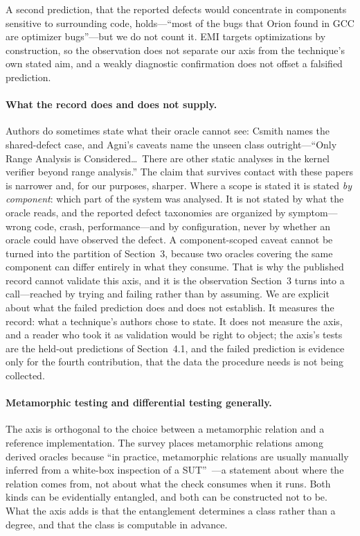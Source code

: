 A second prediction, that the reported defects would concentrate in components
sensitive to surrounding code, holds---``most of the bugs that Orion found in GCC are
optimizer bugs''---but we do not count it. EMI targets optimizations by construction,
so the observation does not separate our axis from the technique's own stated aim, and
a weakly diagnostic confirmation does not offset a falsified prediction.

\paragraph{What the record does and does not supply.}
Authors do sometimes state what their oracle cannot see: Csmith names the shared-defect
case, and Agni's caveats name the unseen class outright---``Only Range Analysis is
Considered\ldots\ There are other static analyses in the kernel verifier beyond range
analysis.'' The claim that survives contact with these papers is narrower and, for our
purposes, sharper. Where a scope is stated it is stated \emph{by component}: which part
of the system was analysed. It is not stated by what the oracle reads, and the reported
defect taxonomies are organized by symptom---wrong code, crash, performance---and by
configuration, never by whether an oracle could have observed the defect. A
component-scoped caveat cannot be turned into the partition of Section~3, because two
oracles covering the same component can differ entirely in what they consume. That is
why the published record cannot validate this axis, and it is the observation
Section~3 turns into a call---reached by trying and failing rather than by assuming.
We are explicit about what the failed prediction does and does not establish. It
measures the record: what a technique's authors chose to state. It does not measure
the axis, and a reader who took it as validation would be right to object; the
axis's tests are the held-out predictions of Section~4.1, and the failed prediction
is evidence only for the fourth contribution, that the data the procedure needs is
not being collected.

\paragraph{Metamorphic testing and differential testing generally.}
The axis is orthogonal to the choice between a metamorphic relation and a reference
implementation. The survey places metamorphic relations among derived oracles because
``in practice, metamorphic relations are usually manually inferred from a white-box
inspection of a SUT''~\cite{barr2015oracle}---a statement about where the relation
comes from, not about what the check consumes when it runs. Both kinds can be
evidentially entangled, and both can be constructed not to be. What the axis adds is
that the entanglement determines a class rather than a degree, and that the class is
computable in advance.
